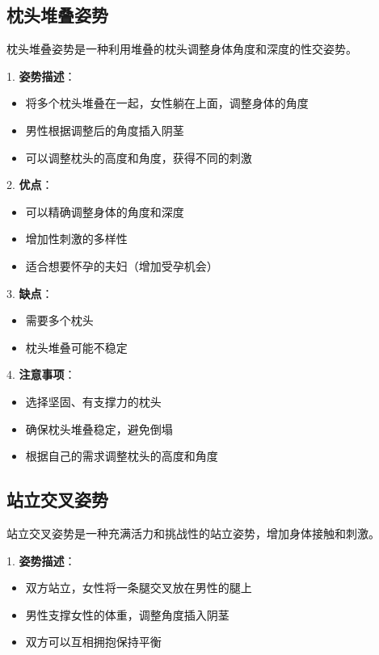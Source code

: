 \documentclass[12pt,UTF8]{ctexbook}
\begin{document}
\subsection{枕头堆叠姿势}

枕头堆叠姿势是一种利用堆叠的枕头调整身体角度和深度的性交姿势。

1. \textbf{姿势描述}：
  \begin{itemize}
  \item 将多个枕头堆叠在一起，女性躺在上面，调整身体的角度
  \item 男性根据调整后的角度插入阴茎
  \item 可以调整枕头的高度和角度，获得不同的刺激
  \end{itemize}

2. \textbf{优点}：
  \begin{itemize}
  \item 可以精确调整身体的角度和深度
  \item 增加性刺激的多样性
  \item 适合想要怀孕的夫妇（增加受孕机会）
  \end{itemize}

3. \textbf{缺点}：
  \begin{itemize}
  \item 需要多个枕头
  \item 枕头堆叠可能不稳定
  \end{itemize}

4. \textbf{注意事项}：
  \begin{itemize}
  \item 选择坚固、有支撑力的枕头
  \item 确保枕头堆叠稳定，避免倒塌
  \item 根据自己的需求调整枕头的高度和角度
  \end{itemize}

\subsection{站立交叉姿势}

站立交叉姿势是一种充满活力和挑战性的站立姿势，增加身体接触和刺激。

1. \textbf{姿势描述}：
  \begin{itemize}
  \item 双方站立，女性将一条腿交叉放在男性的腿上
  \item 男性支撑女性的体重，调整角度插入阴茎
  \item 双方可以互相拥抱保持平衡
  \end{itemize}
\end{document}
